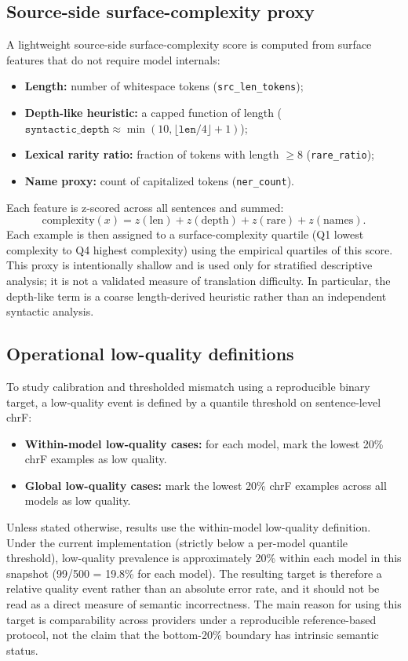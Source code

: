 \documentclass[10pt,conference]{IEEEtran}
\begin{document}
\subsection{Source-side surface-complexity proxy}
A lightweight source-side surface-complexity score is computed from surface features that do not require model internals:
\begin{itemize}[leftmargin=*]
\item \textbf{Length:} number of whitespace tokens (\texttt{src\_len\_tokens});
\item \textbf{Depth-like heuristic:} a capped function of length ($\texttt{syntactic\_depth} \approx \min(10, \lfloor \texttt{len}/4 \rfloor + 1)$);
\item \textbf{Lexical rarity ratio:} fraction of tokens with length $\ge 8$ (\texttt{rare\_ratio});
\item \textbf{Name proxy:} count of capitalized tokens (\texttt{ner\_count}).
\end{itemize}
Each feature is z-scored across all sentences and summed:
\[
\mathrm{complexity}(x)=z(\mathrm{len})+z(\mathrm{depth})+z(\mathrm{rare})+z(\mathrm{names}).
\]
Each example is then assigned to a surface-complexity quartile (Q1 lowest complexity to Q4 highest complexity) using the empirical quartiles of this score. This proxy is intentionally shallow and is used only for stratified descriptive analysis; it is not a validated measure of translation difficulty. In particular, the depth-like term is a coarse length-derived heuristic rather than an independent syntactic analysis.

\subsection{Operational low-quality definitions}
To study calibration and thresholded mismatch using a reproducible binary target, a low-quality event is defined by a quantile threshold on sentence-level chrF:
\begin{itemize}[leftmargin=*]
\item \textbf{Within-model low-quality cases:} for each model, mark the lowest 20\% chrF examples as low quality.
\item \textbf{Global low-quality cases:} mark the lowest 20\% chrF examples across all models as low quality.
\end{itemize}
Unless stated otherwise, results use the within-model low-quality definition. Under the current implementation (strictly below a per-model quantile threshold), low-quality prevalence is approximately 20\% within each model in this snapshot (99/500 = 19.8\% for each model). The resulting target is therefore a relative quality event rather than an absolute error rate, and it should not be read as a direct measure of semantic incorrectness. The main reason for using this target is comparability across providers under a reproducible reference-based protocol, not the claim that the bottom-20\% boundary has intrinsic semantic status.
\end{document}
